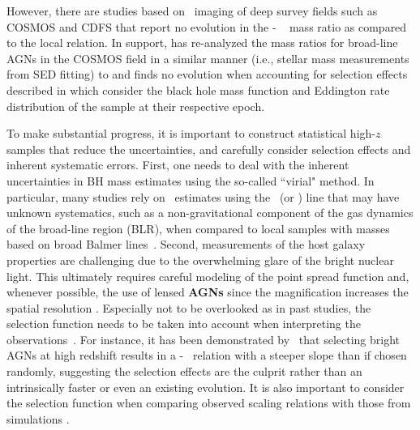 \documentclass[apj]{emulateapj}
\begin{document}
However, there are studies \citep{Cisternas2011,SS13,Mechtley2016} based on \hst\  imaging of deep survey fields such as COSMOS and CDFS that report no evolution in the \mbh - \smass ~ mass ratio as compared to the local relation. In support, \citet{Sun2015} has re-analyzed the mass ratios for broad-line AGNs in the COSMOS field in a similar manner (i.e., stellar mass measurements from SED fitting) to \citet{Merloni2010} and finds no evolution when accounting for selection effects described in \citet{Schulze2014} which consider the black hole mass function and Eddington rate distribution of the sample at their respective epoch. 

To make substantial progress, it is important to construct statistical high-$z$ samples that reduce the uncertainties, and carefully consider selection effects and inherent systematic errors. First, one needs to deal with the inherent uncertainties in BH mass estimates using the so-called ``virial" method. In particular, many studies rely on \mbh\ estimates using the \Civ\ (or \Mgii) line that may have unknown systematics, such as a non-gravitational component of the gas dynamics of the broad-line region (BLR), when compared to local samples with masses based on broad Balmer lines~\citep[i.e., \halpha\ and \hbeta,][]{Schulze2018, Baskin2005, Trakhtenbrot2012}. Second, measurements of the host galaxy properties are challenging due to the overwhelming glare of the bright nuclear light. This ultimately requires careful modeling of the point spread function and, whenever possible, the use of lensed {\bf AGNs} since the magnification increases the spatial resolution \citep{Pen++06qsob, Ding2017a, Ding2017b}. Especially not to be overlooked as in past studies, the selection function needs to be taken into account when interpreting the observations~\citep{Treu2007, Lauer2007}. For instance, it has been demonstrated by~\citet{Schulze2011, Schulze2014} that selecting bright AGNs at high redshift results in a  \mbh - \smass\ relation with a steeper slope than if chosen randomly, suggesting the selection effects are the culprit rather than an intrinsically faster or even an existing evolution. It is also important to consider the selection function when comparing observed scaling relations with those from simulations \citep{DeG++15}.
\end{document}
